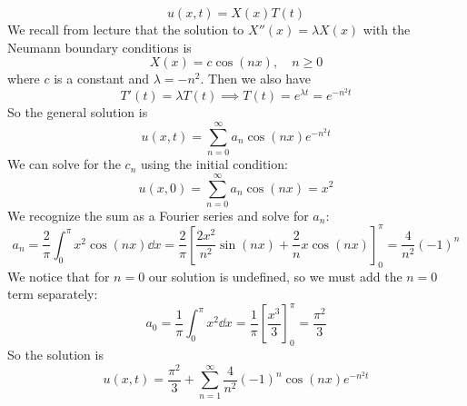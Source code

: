\documentclass[plain]{pset}
\begin{document}
\begin{solution}
    \[u(x, t) = X(x)T(t)\]
    We recall from lecture that the solution to \(X''(x) = \lambda X(x)\) with the Neumann boundary conditions is
    \[
        X(x) = c \cos(nx), \quad n \geq 0
    \]
    where \(c\) is a constant and \(\lambda = -n^2\). Then we also have
    \[T'(t) = \lambda T(t) \implies T(t) = e^{\lambda t} = e^{-n^2t}\]
    So the general solution is
    \[u(x, t) = \sum_{n=0}^\infty a_n \cos(nx) e^{-n^2t}\]
    We can solve for the \(c_n\) using the initial condition:
    \[u(x, 0) = \sum_{n=0}^\infty a_n \cos(nx) = x^2\]
    We recognize the sum as a Fourier series and solve for \(a_n\):
    \[a_n = \frac{2}{\pi} \int_0^\pi x^2 \cos(nx) \dd x = \frac{2}{\pi} \left[\frac{2x^2}{n^2} \sin(nx) + \frac{2}{n}x\cos(nx)\right]_0^\pi = \frac{4}{n^2}(-1)^n\]
    We notice that for \(n = 0\) our solution is undefined, so we must add the \(n = 0\) term separately:
    \[a_0 = \frac{1}{\pi} \int_0^\pi x^2 \dd x = \frac{1}{\pi} \left[\frac{x^3}{3}\right]_0^\pi = \frac{\pi^2}{3}\]
    So the solution is
    \[u(x, t) = \frac{\pi^2}{3} + \sum_{n=1}^\infty \frac{4}{n^2}(-1)^n \cos(nx) e^{-n^2t}\]
\end{solution}

\pagebreak
\end{document}
